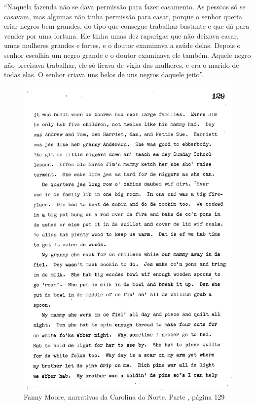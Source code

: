 ``Naquela fazenda
não se dava permissão para fazer casamento. As pessoas só se casavam,
mas algumas não tinha permissão para casar, porque o senhor queria criar
negros bem grandes, do tipo que consegue trabalhar bastante e que dá
para vender por uma fortuna. Ele tinha umas dez raparigas que não
deixava casar, umas mulheres grandes e fortes, e o doutor examinava a
saúde delas. Depois o senhor escolhia um negro grande e o doutor
examinava ele também. Aquele negro não precisava trabalhar, ele só
ficava de vigia das mulheres, e era o marido de todas elas. O senhor
criava uns belos de uns negros daquele jeito''.

\pagebreak
\thispagestyle{empty}
\movetoevenpage
\thispagestyle{empty}

\begin{absolutelynopagebreak}
\begin{vplace}
\begin{figure}[H]
\begin{adjustwidth}{-1.6cm}{}
  \vspace*{-2cm}
  \includegraphics[width=130mm]{./imgs/Cap4.jpg}  
\end{adjustwidth}
  \caption{Fanny Moore, narrativas da Carolina do Norte, Parte , página 129}
\end{figure}
\end{vplace}

\end{absolutelynopagebreak}

